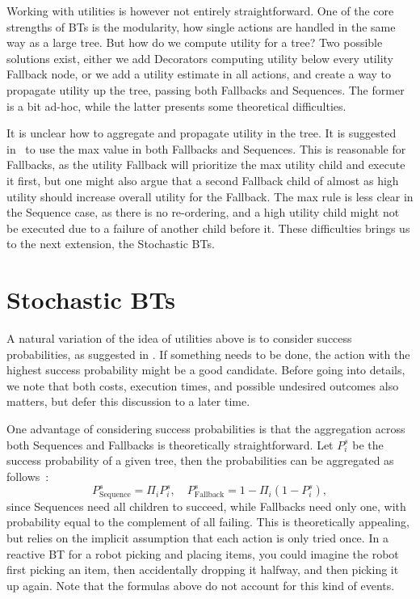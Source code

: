 Working with utilities is however not entirely straightforward. One of the core strengths of BTs is the modularity, how single actions are handled in the same way as a large tree.
But how do we compute utility for a tree?
Two possible solutions exist,
either we add Decorators computing utility below every utility Fallback node, 
or we add a utility estimate in all actions, and create  a way to propagate utility up the tree, passing both Fallbacks and Sequences. 
The former is a bit ad-hoc, while the latter presents some theoretical difficulties.

It is unclear how to aggregate and propagate utility in the tree. It is suggested in~\cite{merrill2014building} to use the max value in both Fallbacks and Sequences.
This is reasonable for Fallbacks, as the utility Fallback will prioritize the max utility child and execute it first, but one might also argue that a second Fallback child of almost as high utility should increase overall utility for the Fallback.
The max rule is less clear in the Sequence case, as there is no re-ordering, and a high utility child might not be executed due to a failure of another child before it.
These difficulties brings us to the next extension, the Stochastic BTs.



\section{Stochastic BTs}
\label{sec:stochastic_extension}
A natural variation of the idea of utilities above is to consider success probabilities, as suggested in  \cite{Colledanchise14,hannaford2016simulation}.
If something needs to be done, the action with the highest success probability might be a good candidate.
Before going into details, we note that both costs, execution times, and possible undesired outcomes also matters,
but defer this discussion to a later time.

One advantage of considering success probabilities is that the aggregation across both Sequences and Fallbacks
is theoretically straightforward. Let  $P^s_i$ be the success probability of a given tree, then
the probabilities can be aggregated  as follows~\cite{hannaford2016simulation}:
\begin{equation}
 P^s_{\mbox{Sequence}} = \Pi_i P^s_i, \quad P^s_{\mbox{Fallback}} = 1- \Pi_i (1- P^s_i),
\end{equation}
since Sequences need all children to succeed, while Fallbacks need only one, with probability equal to the complement of all failing.
This is theoretically appealing, but relies on the implicit assumption that each action is only tried once. In a reactive BT for a robot picking and placing items,
you could imagine the robot first picking an item, then accidentally dropping it halfway, and then picking it up again. 
Note that the formulas above do not account for this kind of events.

